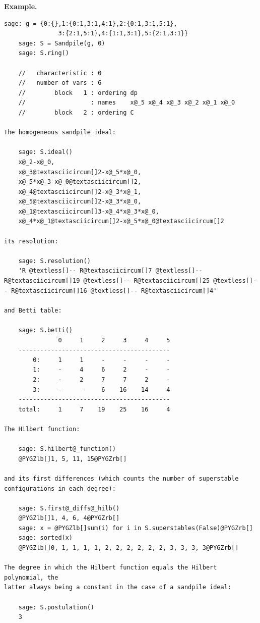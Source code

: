 \documentclass[letterpaper,10pt,english]{manual}
\begin{document}
\textbf{Example.}

\begin{Verbatim}[commandchars=@\[\]]
    sage: g = {0:{},1:{0:1,3:1,4:1},2:{0:1,3:1,5:1},
               3:{2:1,5:1},4:{1:1,3:1},5:{2:1,3:1}}
    sage: S = Sandpile(g, 0)
    sage: S.ring()

    //   characteristic : 0
    //   number of vars : 6
    //        block   1 : ordering dp
    //                  : names    x@_5 x@_4 x@_3 x@_2 x@_1 x@_0
    //        block   2 : ordering C

The homogeneous sandpile ideal:

    sage: S.ideal()
    x@_2-x@_0,
    x@_3@textasciicircum[]2-x@_5*x@_0,
    x@_5*x@_3-x@_0@textasciicircum[]2,
    x@_4@textasciicircum[]2-x@_3*x@_1,
    x@_5@textasciicircum[]2-x@_3*x@_0,
    x@_1@textasciicircum[]3-x@_4*x@_3*x@_0,
    x@_4*x@_1@textasciicircum[]2-x@_5*x@_0@textasciicircum[]2

its resolution:

    sage: S.resolution()
    'R @textless[]-- R@textasciicircum[]7 @textless[]-- R@textasciicircum[]19 @textless[]-- R@textasciicircum[]25 @textless[]-- R@textasciicircum[]16 @textless[]-- R@textasciicircum[]4'

and Betti table:

    sage: S.betti()
               0     1     2     3     4     5
    ------------------------------------------
        0:     1     1     -     -     -     -
        1:     -     4     6     2     -     -
        2:     -     2     7     7     2     -
        3:     -     -     6    16    14     4
    ------------------------------------------
    total:     1     7    19    25    16     4

The Hilbert function:

    sage: S.hilbert@_function()
    @PYGZlb[]1, 5, 11, 15@PYGZrb[]

and its first differences (which counts the number of superstable
configurations in each degree):

    sage: S.first@_diffs@_hilb()
    @PYGZlb[]1, 4, 6, 4@PYGZrb[]
    sage: x = @PYGZlb[]sum(i) for i in S.superstables(False)@PYGZrb[]
    sage: sorted(x)
    @PYGZlb[]0, 1, 1, 1, 1, 2, 2, 2, 2, 2, 2, 3, 3, 3, 3@PYGZrb[]

The degree in which the Hilbert function equals the Hilbert polynomial, the
latter always being a constant in the case of a sandpile ideal:

    sage: S.postulation()
    3
\end{Verbatim}
\end{document}
